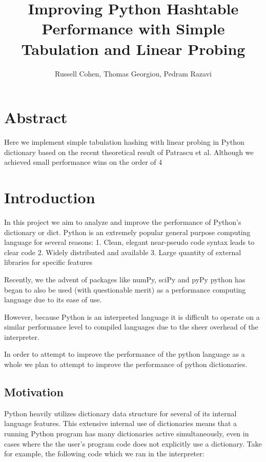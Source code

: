 \documentclass[11pt]{article}
\title{Improving Python Hashtable Performance with Simple Tabulation and Linear  Probing}
\author{Russell Cohen, Thomas Georgiou, Pedram Razavi}
\begin{document}
\maketitle
\section{Abstract} %
Here we implement simple tabulation hashing with linear probing in Python dictionary based on the recent theoretical result of Patrascu et al. Although we achieved small performance wins on the order of 4%




\section{Introduction}
In this project we aim to analyze and improve the performance of Python’s dictionary or dict.  Python is an extremely popular general purpose computing language for several reasons:
1. Clean, elegant near-pseudo code syntax leads to clear code 
2. Widely distributed and available
3. Large quantity of external libraries for specific features 




Recently, we the advent of packages like numPy, sciPy and pyPy python has began to also be used (with questionable merit) as a performance computing language due to its ease of use.




However, because Python is an interpreted language it is difficult to operate on a similar performance level to compiled languages due to the sheer overhead of the interpreter.




In order to attempt to improve the performance of the python language as a whole we plan to attempt to improve the performance of python dictionaries.




\subsection{Motivation}
Python heavily utilizes dictionary data structure for several of its internal language features. This extensive internal use of dictionaries means that a running Python program has many dictionaries active simultaneously, even in cases where the the user’s program code does not explicitly use a dictionary. 
Take for example, the following code which we ran in the interpreter:
\end{document}
